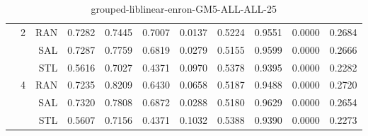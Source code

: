 \begin{center}
\begin{table}[htbp]
\begin{tabular}{ | r | r | r | r | r | r | r | r | r | r | r |}
 & \multirow{3}{*}{2} & RAN & 0.7282 & 0.7445 & 0.7007 & 0.0137 & 0.5224 & 0.9551 & 0.0000 & 0.2684\\ \cline{3-11}
 &   & SAL & 0.7287 & 0.7759 & 0.6819 & 0.0279 & 0.5155 & 0.9599 & 0.0000 & 0.2666\\ \cline{3-11}
 &   & STL & 0.5616 & 0.7027 & 0.4371 & 0.0970 & 0.5378 & 0.9395 & 0.0000 & 0.2282\\ \cline{2-11}
 & \multirow{3}{*}{4} & RAN & 0.7235 & 0.8209 & 0.6430 & 0.0658 & 0.5187 & 0.9488 & 0.0000 & 0.2720\\ \cline{3-11}
 &   & SAL & 0.7320 & 0.7808 & 0.6872 & 0.0288 & 0.5180 & 0.9629 & 0.0000 & 0.2654\\ \cline{3-11}
 &   & STL & 0.5607 & 0.7156 & 0.4371 & 0.1032 & 0.5388 & 0.9390 & 0.0000 & 0.2273\\ \cline{2-11}
\hline
\end{tabular}
\caption{grouped-liblinear-enron-GM5-ALL-ALL-25}
\end{table}
\end{center}


